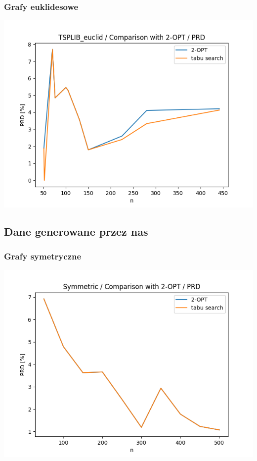 \documentclass{article}
\begin{document}
\subsubsection{Grafy euklidesowe}

\begin{center}
\includegraphics[width=\textwidth, 
                   height = 0.4\textheight, 
                   keepaspectratio]
                  {plots/two_opt_tsplib_euclid_prd} 
\end{center}


\subsection{Dane generowane przez nas}


\subsubsection{Grafy symetryczne}

\begin{center}
\includegraphics[width=\textwidth, 
                   height = 0.4\textheight, 
                   keepaspectratio]
                  {plots/two_opt_symmetric_prd} 
\end{center}
\end{document}
